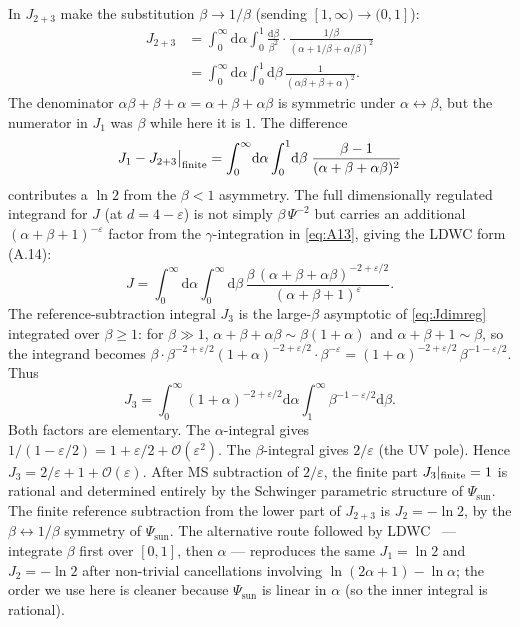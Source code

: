 \documentclass[10pt,a4paper,twocolumn]{article}
\theoremstyle{plain}
\theoremstyle{definition}
\newcommand{\dd}{\mathrm{d}}
\renewcommand{\Psi}{\varPsi}
\newcommand{\eps}{\varepsilon}
\begin{document}
In $J_{2+3}$ make the substitution $\beta \to 1/\beta$ (sending
$[1,\infty) \to (0,1]$):
\begin{align*}
  J_{2+3}
  &= \!\int_0^\infty\!\!\dd\alpha\!\int_0^1\!\!\tfrac{\dd\beta}{\beta^2}\cdot
    \tfrac{1/\beta}{(\alpha + 1/\beta + \alpha/\beta)^2}\\
  &= \!\int_0^\infty\!\!\dd\alpha\!\int_0^1\!\!\dd\beta\,
    \tfrac{1}{(\alpha\beta+\beta+\alpha)^2}.
\end{align*}
The denominator $\alpha\beta+\beta+\alpha = \alpha+\beta+\alpha\beta$
is symmetric under $\alpha\leftrightarrow\beta$, but the numerator
in $J_1$ was $\beta$ while here it is $1$.  The difference
\[
  J_1 - J_{2+3}\big|_{\rm finite}
  = \int_0^\infty\!\dd\alpha\int_0^1\!\dd\beta\;
    \frac{\beta - 1}{(\alpha+\beta+\alpha\beta)^2}
\]
contributes a $\ln 2$ from the $\beta < 1$ asymmetry.
The full dimensionally regulated integrand for $J$ (at $d=4-\eps$)
is not simply $\beta\,\Psi^{-2}$ but carries an additional
$(\alpha+\beta+1)^{-\eps}$ factor from the $\gamma$-integration in
\eqref{eq:A13}, giving the LDWC form (A.14):
\begin{equation}\label{eq:Jdimreg}
  J = \!\int_0^\infty\!\!\dd\alpha\!\int_0^\infty\!\!\dd\beta\,
    \frac{\beta\,(\alpha{+}\beta{+}\alpha\beta)^{-2+\eps/2}}
         {(\alpha{+}\beta{+}1)^{\eps}}.
\end{equation}
The reference-subtraction integral $J_3$ is the large-$\beta$
asymptotic of \eqref{eq:Jdimreg} integrated over $\beta \ge 1$:
for $\beta \gg 1$, $\alpha+\beta+\alpha\beta \sim \beta(1+\alpha)$
and $\alpha+\beta+1 \sim \beta$, so the integrand becomes
$\beta \cdot \beta^{-2+\eps/2}(1+\alpha)^{-2+\eps/2}\cdot\beta^{-\eps}
= (1+\alpha)^{-2+\eps/2}\,\beta^{-1-\eps/2}$.  Thus
\begin{equation}\label{eq:J3}
  J_3
  = \!\int_0^\infty\!\!(1+\alpha)^{-2+\eps/2}\dd\alpha
    \!\int_1^\infty\!\!\beta^{-1-\eps/2}\dd\beta.
\end{equation}
Both factors are elementary.  The $\alpha$-integral gives
$1/(1-\eps/2) = 1 + \eps/2 + \mathcal{O}(\eps^2)$.  The
$\beta$-integral gives $2/\eps$ (the UV pole).  Hence
$J_3 = 2/\eps + 1 + \mathcal{O}(\eps)$.
After MS subtraction of $2/\eps$, the finite part
$J_3|_{\rm finite} = 1$ is rational and determined entirely by
the Schwinger parametric structure of $\Psi_{\text{sun}}$.
The finite reference subtraction from the lower part of $J_{2+3}$
is $J_2 = -\ln 2$, by the $\beta\leftrightarrow 1/\beta$ symmetry of
$\Psi_{\text{sun}}$.  The alternative route followed by
LDWC~\citep{LDWC2002} --- integrate $\beta$ first over $[0,1]$,
then $\alpha$ --- reproduces the same $J_1 = \ln 2$ and
$J_2 = -\ln 2$ after non-trivial cancellations involving
$\ln(2\alpha+1)-\ln\alpha$; the order we use here is cleaner
because $\Psi_{\text{sun}}$ is linear in $\alpha$ (so the inner
integral is rational).
\end{document}
